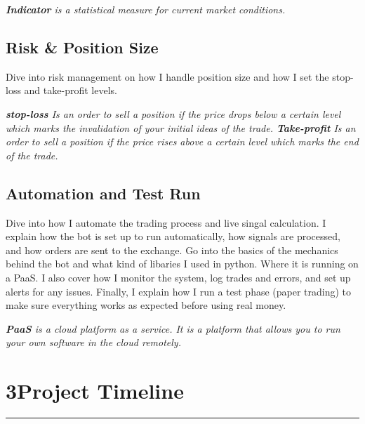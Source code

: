 \documentclass[12pt,a4paper]{article}
\begin{document}



\vspace{0.5em}
\noindent\textit{\footnotesize%
\textbf{Indicator} is a statistical measure for current market conditions.
}







\subsection{Risk \& Position Size}
Dive into risk management on how I handle position size and how I set the stop-loss and take-profit levels. 

\vspace{0.5em}
\noindent\textit{\footnotesize%
\textbf{stop-loss} Is an order to sell a position if the price drops below a certain level which marks the invalidation of your initial ideas of the trade.
\textbf{Take-profit} Is an order to sell a position if the price rises above a certain level which marks the end of the trade.
}




\newpage

\subsection{Automation and Test Run}
Dive into how I automate the trading process and live singal calculation. I explain how the bot
is set up to run automatically, how signals are processed, and how orders
are sent to the exchange.
Go into the basics of the mechanics behind the bot and what kind of libaries I used in python. Where it is running on a PaaS.
I also cover how I monitor the system, log trades
and errors, and set up alerts for any issues. Finally, I explain how I run a
test phase (paper trading) to make sure everything works as expected before
using real money.

\vspace{0.5em}
\noindent\textit{\footnotesize%
\textbf{PaaS} is a cloud platform as a service. It is a platform that allows you to run your own software in the cloud remotely.}


\section*{3\hspace{1em}Project Timeline}
\vspace{-0.5em}
\noindent\rule{\textwidth}{0.5pt}
\end{document}
